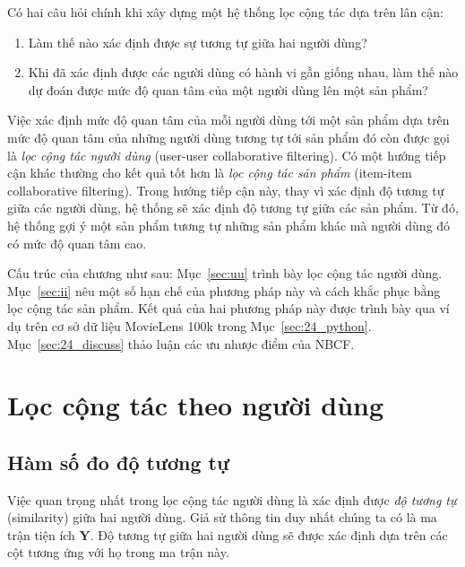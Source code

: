 Có hai câu hỏi chính khi xây dựng một hệ thống lọc cộng tác dựa trên lân cận:
\begin{enumerate}
\item Làm thế nào xác định được {sự tương tự} giữa hai người dùng?
\item Khi đã xác định được các người dùng có hành vi {gần giống nhau}, làm thế nào dự đoán được {mức độ quan tâm} của một người dùng lên một sản phẩm?
\end{enumerate}

Việc xác định mức độ quan tâm của mỗi người dùng tới một sản phẩm dựa trên mức
độ quan tâm của những người dùng tương tự tới sản phẩm đó còn được gọi là
\textit{lọc cộng tác người dùng} (user-user collaborative filtering). Có
một hướng tiếp cận khác thường cho kết quả tốt hơn là \textit{lọc cộng tác
sản phẩm} (item-item collaborative filtering). Trong hướng tiếp cận này, thay vì
xác định độ tương tự giữa các người dùng, hệ thống sẽ xác định độ tương tự
giữa các sản phẩm. Từ đó, hệ thống gợi ý một sản phẩm tương tự những sản phẩm
khác mà người dùng đó có mức độ quan tâm cao.

Cấu trúc của chương như sau: Mục~\ref{sec:uu} trình bày lọc cộng tác người
dùng. Mục~\ref{sec:ii} nêu một số hạn chế của phương pháp này và cách khắc phục
bằng lọc cộng tác sản phẩm. Kết quả của hai phương pháp này được trình bày
qua ví dụ trên cơ sở dữ liệu MovieLens 100k trong Mục~\ref{sec:24_python}.
Mục~\ref{sec:24_discuss} thảo luận các ưu nhược điểm của NBCF.


\section{Lọc cộng tác theo người dùng}
\label{sec:uu}
\subsection{Hàm số đo độ tương tự}
Việc quan trọng nhất trong lọc cộng tác người dùng là xác định được
\textit{độ tương tự} ({similarity}) giữa hai người dùng. Giả sử thông tin duy
nhất chúng ta có là ma trận tiện ích $\mathbf{Y}$. Độ tương tự giữa hai người
dùng sẽ được xác định dựa trên các cột tương ứng với họ trong ma trận này.

